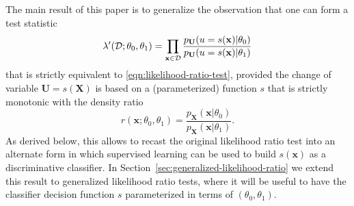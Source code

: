 \documentclass[12pt]{article}
\numberwithin{equation}{section}
\theoremstyle{plain}
\begin{document}
The main result of this paper is to
generalize the observation that one can form a test statistic
\begin{equation}\label{eqn:likelihood-ratio-test-equiv}
\lambda'({\cal D}; \theta_0, \theta_1) = \prod_{\mathbf{x} \in {\cal D}} \frac{ p_\mathbf{U}(u=s(\mathbf{x}) | \theta_0)}{ p_\mathbf{U}(u=s(\mathbf{x}) | \theta_1)}
\end{equation}
that is strictly equivalent to \ref{eqn:likelihood-ratio-test}, provided the change
of variable $\mathbf{U} = s(\mathbf{X})$ is based
on a (parameterized) function $s$ that is strictly monotonic with the density ratio
\begin{equation}
r(\mathbf{x};\theta_0, \theta_1) = \frac{p_\mathbf{X}(\mathbf{x}|\theta_0)}{p_\mathbf{X}(\mathbf{x}|\theta_1)}.
\end{equation}
As derived below, this allows to recast the original likelihood ratio test into
an alternate form in which supervised learning can be used to build
$s(\mathbf{x})$ as a discriminative classifier.  In
Section~\ref{sec:generalized-likelihood-ratio} we extend this result to
generalized likelihood ratio tests, where it will be useful to have the
classifier decision function $s$ parameterized in terms of $(\theta_0, \theta_1)$.

\end{document}
